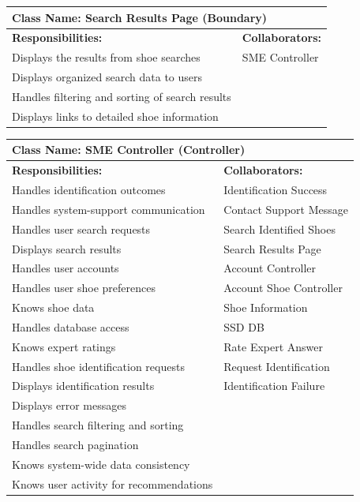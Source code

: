 \documentclass[]{article}
\begin{document}
\begin{table}[h]
    \centering
    \begin{tabular}{|p{}|p{}|}
        \hline
        \multicolumn{2}{|l|}{\textbf{Class Name:} Search Results Page (Boundary)} \\
        \hline
        \textbf{Responsibilities:} & \textbf{Collaborators:} \\
        \hline
        Displays the results from shoe searches & SME Controller \\
        Displays organized search data to users &  \\
        Handles filtering and sorting of search results &  \\
        Displays links to detailed shoe information &  \\
        \hline
    \end{tabular}
    \label{tab:search_results_page}
\end{table}

\begin{table}[H]
    \centering
    \begin{tabular}{|p{}|p{}|}
        \hline
        \multicolumn{2}{|l|}{\textbf{Class Name:} SME Controller (Controller)} \\
        \hline
        \textbf{Responsibilities:} & \textbf{Collaborators:} \\
        \hline
        Handles identification outcomes & Identification Success \\  
        Handles system-support communication & Contact Support Message \\  
        Handles user search requests & Search Identified Shoes \\  
        Displays search results & Search Results Page \\  
        Handles user accounts & Account Controller \\  
        Handles user shoe preferences & Account Shoe Controller \\  
        Knows shoe data & Shoe Information \\  
        Handles database access & SSD DB \\  
        Knows expert ratings & Rate Expert Answer \\  
        Handles shoe identification requests & Request Identification \\  
        Displays identification results & Identification Failure\\  
        Displays error messages & \\  
        Handles search filtering and sorting & \\  
        Handles search pagination & \\  
        Knows system-wide data consistency & \\  
        Knows user activity for recommendations & \\  
        \hline
    \end{tabular}
    \label{tab:sme_controller}
\end{table}
\end{document}
